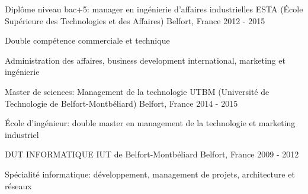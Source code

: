 

\begin{cventries}
    
\cventry
	{Diplôme niveau bac+5: manager en ingénierie d'affaires industrielles} %
	{ESTA (École Supérieure des Technologies et des Affaires)} %
	{Belfort, France} %
	{2012 - 2015} %
	{
	   	\begin{cvitems} %
	   		\item {Double compétence commerciale et technique}
	   		\item {Administration des affaires, business development international, marketing et ingénierie}
	  	\end{cvitems}
	}
	
  \cventry
    {Master de sciences:  Management de la technologie} %
    {UTBM (Université de Technologie de Belfort-Montbéliard)} %
    {Belfort, France} %
    {2014 - 2015} %
    {
      \begin{cvitems} %
        \item {École d'ingénieur: double master en management de la technologie et marketing industriel}
      \end{cvitems}
    }

  \cventry
    {DUT INFORMATIQUE} %
    {IUT de Belfort-Montbéliard} %
    {Belfort, France} %
    {2009 - 2012} %
    {
      \begin{cvitems} %
        \item {Spécialité informatique: développement, management de projets, architecture et réseaux}
      \end{cvitems}
    }

\end{cventries}
